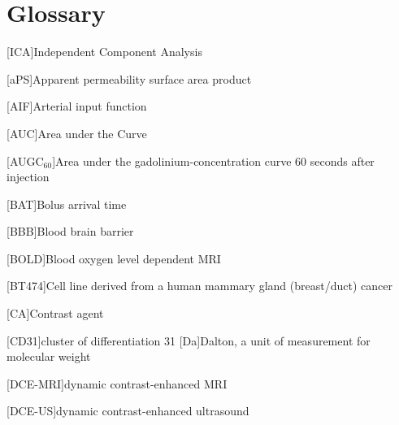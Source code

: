 
\chapter{Glossary}


\begin{acronym}

[ICA]{Independent Component Analysis}%

[aPS]{Apparent permeability surface area product}%

[AIF]{Arterial input function}

[AUC]{Area under the Curve}%

[AUGC$_{60}$]{Area under the gadolinium-concentration curve 60 seconds after injection}

[BAT]{Bolus arrival time}

[BBB]{Blood brain barrier}

[BOLD]{Blood oxygen level dependent MRI}

[BT474]{Cell line derived from a human mammary gland (breast/duct) cancer}

[CA]{Contrast agent}

[CD31]{cluster of differentiation 31}%
[Da]{Dalton, a unit of measurement for molecular weight}

[DCE-MRI]{dynamic contrast-enhanced MRI}

[DCE-US]{dynamic contrast-enhanced ultrasound}%


\end{acronym}
